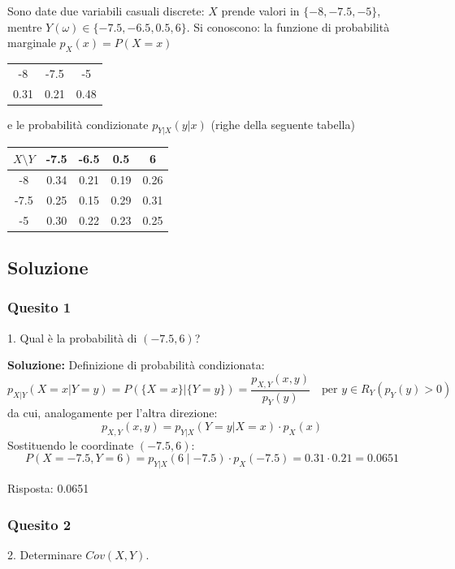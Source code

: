 \documentclass[12pt, a4paper]{article}
\begin{document}
\vspace{0.5cm}
\begin{tcolorbox}[colback=lightergray!10, colframe=tocsec, title=\textbf{Esercizio 8}]
Sono date due variabili casuali discrete: $X$ prende valori in $\{-8, -7.5, -5\}$, mentre $Y(\omega) \in \{-7.5, -6.5, 0.5, 6\}$.
Si conoscono: la funzione di probabilità marginale $p_X(x)=P(X=x)$
\begin{center}
\begin{tabular}{ccc}
\toprule
-8 & -7.5 & -5 \\
0.31 & 0.21 & 0.48 \\
\bottomrule
\end{tabular}
\end{center}
e le probabilità condizionate $p_{Y|X}(y|x)$ (righe della seguente tabella)
\begin{center}
\begin{tabular}{c|cccc}
\toprule
$X \setminus Y$ & -7.5 & -6.5 & 0.5 & 6 \\
\midrule
-8 & 0.34 & 0.21 & 0.19 & 0.26 \\
-7.5 & 0.25 & 0.15 & 0.29 & 0.31 \\
-5 & 0.30 & 0.22 & 0.23 & 0.25 \\
\bottomrule
\end{tabular}
\end{center}
\end{tcolorbox}

\subsection*{Soluzione}

\subsubsection*{Quesito 1}
1. Qual è la probabilità di $(-7.5, 6)$?

\textbf{Soluzione:}
Definizione di probabilità condizionata:
$$ p_{X|Y}(X=x|Y=y) = P(\{X=x\}|\{Y=y\}) = \frac{p_{X,Y}(x,y)}{p_Y(y)} \quad \text{per } y \in R_Y(p_Y(y)>0) $$
da cui, analogamente per l'altra direzione:
$$ p_{X,Y}(x,y) = p_{Y|X}(Y=y|X=x) \cdot p_X(x) $$
Sostituendo le coordinate $(-7.5, 6)$:
$$ P(X=-7.5, Y=6) = p_{Y|X}(6 \mid -7.5) \cdot p_X(-7.5) = 0.31 \cdot 0.21 = 0.0651 $$

Risposta: 0.0651

\subsubsection*{Quesito 2}
2. Determinare $Cov(X,Y)$.
\end{document}
